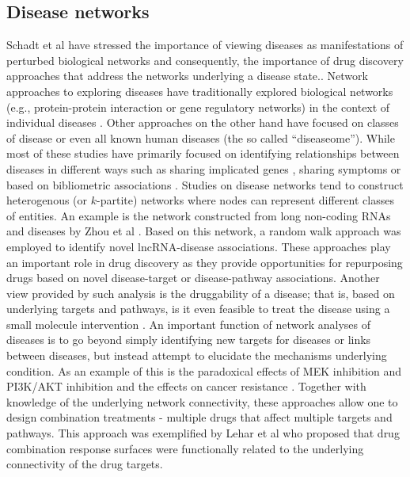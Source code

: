 \documentclass[]{book}
\begin{document}
\subsection{Disease networks}
\label{sec:disease-networks}

Schadt et al \cite{Schadt:2009zl} have stressed the importance of
viewing diseases as manifestations of perturbed biological networks
and consequently, the importance of drug discovery approaches that
address the networks underlying a disease state.. Network approaches
to exploring diseases have traditionally explored biological networks
(e.g., protein-protein interaction or gene regulatory networks) in the
context of individual diseases \cite{Lim:2006fe,
  Altieri:2008aa}. Other approaches on the other hand have focused on
classes of disease \cite{Zhang:2013tx} or even all known human
diseases \cite{Goh:2007aa} (the so called ``diseaseome''). While most
of these studies have primarily focused on identifying relationships
between diseases in different ways such as sharing implicated genes
\cite{Bauer-Mehren:2011tv,Goh:2007aa}, sharing symptoms
\cite{Zhou:2014qp} or based on bibliometric associations
\cite{Zhang:2014sh}. Studies on disease networks tend to construct
heterogenous (or $k$-partite) networks where nodes can represent
different classes of entities. An example is the network constructed
from long non-coding RNAs and diseases by Zhou et al
\cite{Zhou:2015if}. Based on this network, a random walk approach was
employed to identify novel lncRNA-disease associations. These
approaches play an important role in drug discovery as they provide
opportunities for repurposing drugs based on novel disease-target or
disease-pathway associations. Another view provided by such analysis
is the druggability of a disease; that is, based on underlying targets
and pathways, is it even feasible to treat the disease using a small
molecule intervention \cite{Boran:2010fk}. An important function of
network analyses of diseases is to go beyond simply identifying new
targets for diseases or links between diseases, but instead attempt to
elucidate the mechanisms underlying condition. As an example of this is
the paradoxical effects of MEK inhibition and PI3K/AKT inhibition and
the effects on cancer resistance \cite{Sos:2009gc}. Together with knowledge
of the underlying network connectivity, these approaches allow one to
design combination treatments - multiple drugs that affect multiple
targets and pathways. This approach was exemplified by Lehar et al
\cite{Lehar:2009gu} who proposed that drug combination response
surfaces were functionally related to the underlying connectivity of
the drug targets.
\end{document}
